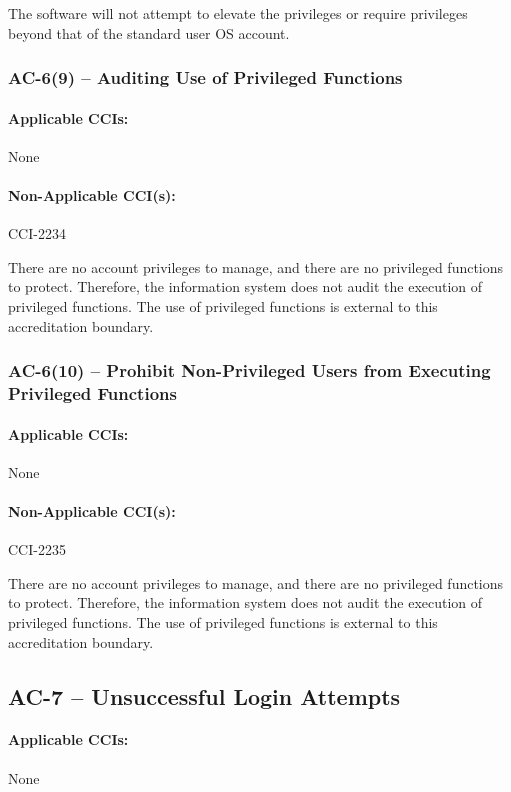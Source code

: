 \documentclass[letterpaper, 10pt, twoside]{article}
\begin{document}
The software will not attempt to elevate the privileges or require privileges beyond that of the standard user OS account.

\subsubsection{AC-6(9) -- Auditing Use of Privileged Functions}

\paragraph{Applicable CCIs:} None

\paragraph{Non-Applicable CCI(s):} CCI-2234

There are no account privileges to manage, and there are no privileged functions to protect. Therefore, the information system does not audit the execution of privileged functions. The use of privileged functions is external to this accreditation boundary.

\subsubsection{AC-6(10) -- Prohibit Non-Privileged Users from Executing Privileged Functions}

\paragraph{Applicable CCIs:} None

\paragraph{Non-Applicable CCI(s):} CCI-2235

There are no account privileges to manage, and there are no privileged functions to protect. Therefore, the information system does not audit the execution of privileged functions. The use of privileged functions is external to this accreditation boundary.

\subsection{AC-7 -- Unsuccessful Login Attempts}

\paragraph{Applicable CCIs:} None
\end{document}
